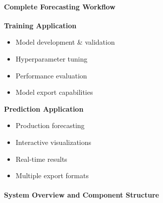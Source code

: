 %
%
%




{
  \framesubtitle{Complete Forecasting Workflow}
  
  \begin{figure}[H]
    \centering
    
  \end{figure}

    \vspace{2cm}


  \textbf{Training Application}
  \begin{itemize}
    \item Model development \& validation
    \item Hyperparameter tuning
    \item Performance evaluation
    \item Model export capabilities
  \end{itemize}

  \textbf{Prediction Application}
  \begin{itemize}
    \item Production forecasting
    \item Interactive visualizations
    \item Real-time results
    \item Multiple export formats
  \end{itemize}
}


{
	\framesubtitle{System Overview and Component Structure}
	\begin{figure}[H]
		\centering
		
	\end{figure}
}

